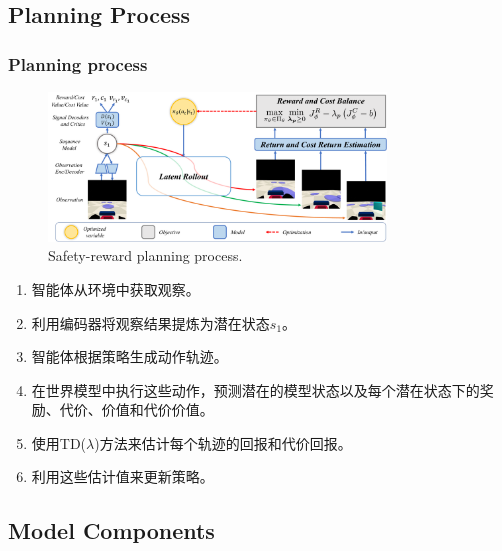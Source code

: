 \documentclass[10pt,mathserif]{beamer}%
\begin{document}
\subsection{Planning Process}
\begin{frame}[t,fragile]
    \frametitle{Planning process}
    \begin{figure}[ht]
  \centering
  \includegraphics[width=0.8\textwidth]{images/architecture.pdf}
  \caption{Safety-reward planning process.}
  \label{fig:architecture}
\end{figure}
\vspace{-0.5cm}
\begin{spacing}{1.2}

\begin{enumerate}
\item 智能体从环境中获取观察。
\item 利用编码器将观察结果提炼为潜在状态$s_1$。
\item 智能体根据策略生成动作轨迹。
\item 在世界模型中执行这些动作，预测潜在的模型状态以及每个潜在状态下的奖励、代价、价值和代价价值。
\item 使用TD($\lambda$)方法来估计每个轨迹的回报和代价回报。
\item 利用这些估计值来更新策略。
\end{enumerate}
    
\end{spacing}

\end{frame}


\subsection{Model Components}
\end{document}
